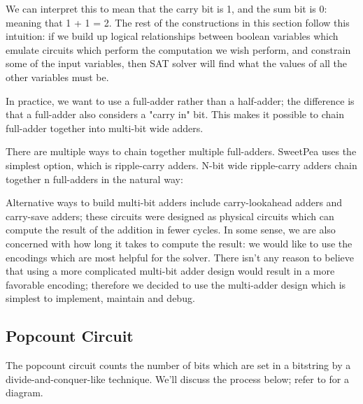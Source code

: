 We can interpret this to mean that the carry bit is 1, and the sum bit is 0: meaning that 1 + 1 = 2. The rest of the constructions in this section follow this intuition: if we build up logical relationships between boolean variables which emulate circuits which perform the computation we wish perform, and constrain some of the input variables, then SAT solver will find what the values of all the other variables must be.

In practice, we want to use a full-adder rather than a half-adder; the difference is that a full-adder also considers a "carry in" bit. This makes it possible to chain full-adder together into multi-bit wide adders.

There are multiple ways to chain together multiple full-adders. SweetPea uses the simplest option, which is ripple-carry adders. N-bit wide ripple-carry adders chain together n full-adders in the natural way:

Alternative ways to build multi-bit adders include carry-lookahead adders and carry-save adders; these circuits were designed as physical circuits which can compute the result of the addition in fewer cycles. In some sense, we are also concerned with how long it takes to compute the result: we would like to use the encodings which are most helpful for the solver. There isn't any reason to believe that using a more complicated multi-bit adder design would result in a more favorable encoding; therefore we decided to use the multi-adder design which is simplest to implement, maintain and debug.

\subsection{Popcount Circuit}

The popcount circuit counts the number of bits which are set in a bitstring by a divide-and-conquer-like technique. We'll discuss the process below; refer to  for a diagram.

